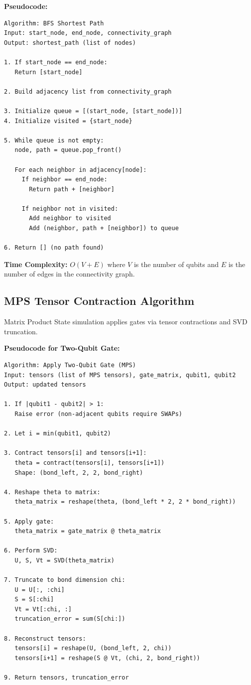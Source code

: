 \textbf{Pseudocode:}
\begin{verbatim}
Algorithm: BFS Shortest Path
Input: start_node, end_node, connectivity_graph
Output: shortest_path (list of nodes)

1. If start_node == end_node:
   Return [start_node]

2. Build adjacency list from connectivity_graph

3. Initialize queue = [(start_node, [start_node])]
4. Initialize visited = {start_node}

5. While queue is not empty:
   node, path = queue.pop_front()
   
   For each neighbor in adjacency[node]:
     If neighbor == end_node:
       Return path + [neighbor]
     
     If neighbor not in visited:
       Add neighbor to visited
       Add (neighbor, path + [neighbor]) to queue

6. Return [] (no path found)
\end{verbatim}

\textbf{Time Complexity:} $O(V + E)$ where $V$ is the number of qubits and $E$ is the number of edges in the connectivity graph.

\subsection{MPS Tensor Contraction Algorithm}
Matrix Product State simulation applies gates via tensor contractions and SVD truncation.

\textbf{Pseudocode for Two-Qubit Gate:}
\begin{verbatim}
Algorithm: Apply Two-Qubit Gate (MPS)
Input: tensors (list of MPS tensors), gate_matrix, qubit1, qubit2
Output: updated tensors

1. If |qubit1 - qubit2| > 1:
   Raise error (non-adjacent qubits require SWAPs)

2. Let i = min(qubit1, qubit2)

3. Contract tensors[i] and tensors[i+1]:
   theta = contract(tensors[i], tensors[i+1])
   Shape: (bond_left, 2, 2, bond_right)

4. Reshape theta to matrix:
   theta_matrix = reshape(theta, (bond_left * 2, 2 * bond_right))

5. Apply gate:
   theta_matrix = gate_matrix @ theta_matrix

6. Perform SVD:
   U, S, Vt = SVD(theta_matrix)

7. Truncate to bond dimension chi:
   U = U[:, :chi]
   S = S[:chi]
   Vt = Vt[:chi, :]
   truncation_error = sum(S[chi:])

8. Reconstruct tensors:
   tensors[i] = reshape(U, (bond_left, 2, chi))
   tensors[i+1] = reshape(S @ Vt, (chi, 2, bond_right))

9. Return tensors, truncation_error
\end{verbatim}

